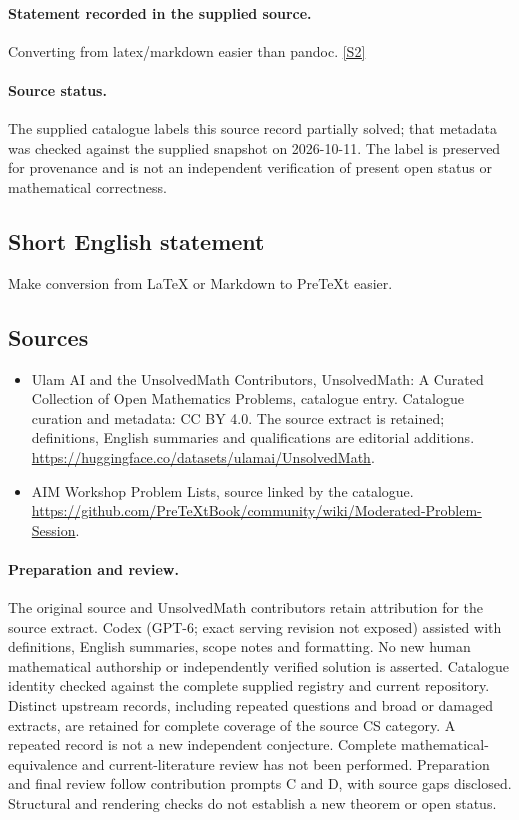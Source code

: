 \documentclass[11pt]{article}
\begin{document}
\paragraph{Statement recorded in the supplied source.}
Converting from latex/markdown easier than pandoc. \href{https://github.com/PreTeXtBook/community/wiki/Moderated-Problem-Session}{[S2]}
\paragraph{Source status.}
The supplied catalogue labels this source record partially solved; that metadata was checked against the supplied snapshot on 2026-10-11. The label is preserved for provenance and is not an independent verification of present open status or mathematical correctness.
\subsection{Short English statement}
Make conversion from LaTeX or Markdown to PreTeXt easier.
\subsection{Sources}
\begin{itemize}
\item[S1] Ulam AI and the UnsolvedMath Contributors, UnsolvedMath: A Curated Collection of Open Mathematics Problems, catalogue entry. Catalogue curation and metadata: CC BY 4.0. The source extract is retained; definitions, English summaries and qualifications are editorial additions.
\url{https://huggingface.co/datasets/ulamai/UnsolvedMath}.
\item[S2] AIM Workshop Problem Lists, source linked by the catalogue.
\url{https://github.com/PreTeXtBook/community/wiki/Moderated-Problem-Session}.
\end{itemize}
\paragraph{Preparation and review.}
The original source and UnsolvedMath contributors retain attribution for the source extract. Codex (GPT-6; exact serving revision not exposed) assisted with definitions, English summaries, scope notes and formatting. No new human mathematical authorship or independently verified solution is asserted. Catalogue identity checked against the complete supplied registry and current repository. Distinct upstream records, including repeated questions and broad or damaged extracts, are retained for complete coverage of the source CS category. A repeated record is not a new independent conjecture. Complete mathematical-equivalence and current-literature review has not been performed. Preparation and final review follow contribution prompts C and D, with source gaps disclosed. Structural and rendering checks do not establish a new theorem or open status.
\label{end:statement}
\end{document}
